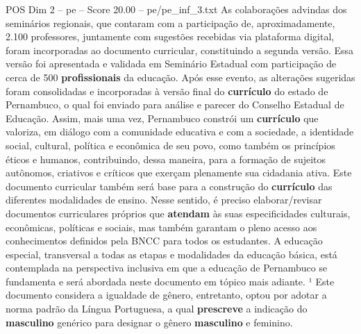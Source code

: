 \begin{textsample}{POS Dim 2 – pe – Score 20.00 – pe/pe\_inf\_3.txt}
As colaborações advindas dos seminários regionais, que contaram com a participação de, aproximadamente, 2.100 professores, juntamente com sugestões recebidas via plataforma digital, foram incorporadas ao documento curricular, constituindo a segunda versão.
Essa versão foi apresentada e validada em Seminário Estadual com participação de cerca de 500 \textbf{profissionais} da educação.
Após esse evento, as alterações sugeridas foram consolidadas e incorporadas à versão final do \textbf{currículo} do estado de Pernambuco, o qual foi enviado para análise e parecer do Conselho Estadual de Educação.
Assim, mais uma vez, Pernambuco constrói um \textbf{currículo} que valoriza, em diálogo com a comunidade educativa e com a sociedade, a identidade social, cultural, política e econômica de seu povo, como também os princípios éticos e humanos, contribuindo, dessa maneira, para a formação de sujeitos autônomos, criativos e críticos que exerçam plenamente sua cidadania ativa.
Este documento curricular também será base para a construção do \textbf{currículo} das diferentes modalidades de ensino.
Nesse sentido, é preciso elaborar/revisar documentos curriculares próprios que \textbf{atendam} às suas especificidades culturais, econômicas, políticas e sociais, mas também garantam o pleno acesso aos conhecimentos definidos pela BNCC para todos os estudantes.
A educação especial, transversal a todas as etapas e modalidades da educação básica, está contemplada na perspectiva inclusiva em que a educação de Pernambuco se fundamenta e será abordada neste documento em tópico mais adiante. ¹ Este documento considera a igualdade de gênero, entretanto, optou por adotar a norma padrão da Língua Portuguesa, a qual \textbf{prescreve} a indicação do \textbf{masculino} genérico para designar o gênero \textbf{masculino} e feminino.

\end{textsample}
